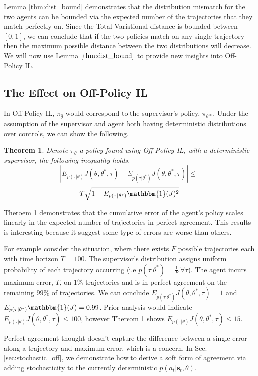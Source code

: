 \documentclass[conference]{article}
\newcommand{\bs}{\mathbf{s}}
\newtheorem{theorem}{Theorem}[section]
\begin{document}
Lemma \ref{thm:dist_bound} demonstrates that the distribution mismatch for the two agents can be bounded via the expected number of the trajectories that they match perfectly on.  Since the Total Variational distance is bounded between $[0,1]$, we can conclude that if the two policies match on any single trajectory then the maximum possible distance between the two distributions will decrease. We will now use Lemma $\ref{thm:dist_bound}$ to provide new insights into Off-Policy IL. 


\subsection{The Effect on Off-Policy IL} In Off-Policy IL, $\pi_{\hat{\theta}}$ would correspond to the supervisor's policy, $\pi_{\theta*}$. Under the assumption of the supervisor and agent both having deterministic distributions over controls, we can show the following. 

\begin{theorem}\label{thm:bc}
Denote $\pi_{\theta}$ a policy found using Off-Policy IL, with a deterministic supervisor, the following inequality holds:
$$ |E_{p(\tau|\theta)} J(\theta,\theta^*,\tau)  - E_{p(\tau|\theta^*)} J(\theta,\theta^*,\tau) | \leq \: $$
$$ T\sqrt{1 - E_{p(\tau|\theta^*)} \mathbbm{1}(J)^2} $$
\end{theorem}


Theroem \ref{thm:bc} demonstrates that the cumulative error of the agent's policy scales linearly in the expected number of trajectories in perfect agreement. This results is interesting because it suggest some type of errors are worse than others.

For example consider the situation, where there exists $F$ possible trajectories each with time horizon $T=100$. The supervisor's distribution assigns uniform probability of each trajectory occurring (i.e $p(\tau|\theta^*) = \frac{1}{F} \: \forall \tau$).  The agent incurs maximum error, $T$, on $1\%$ trajectories and is in perfect agreement on the remaining $99\%$ of trajectories. We can conclude $E_{p(\tau|\theta^*)} J(\theta,\theta^*,\tau) = 1$ and $E_{p(\tau|\theta^*)} \mathbbm{1}(J)  = 0.99$. Prior analysis would indicate $ E_{p(\tau|\theta)} J(\theta,\theta^*,\tau) \leq 100$, however Thereom \ref{thm:bc} shows $ E_{p(\tau|\theta)} J(\theta,\theta^*,\tau) \leq 15$. 

Perfect agreement thought doesn't capture the difference between a single error along a trajectory and maximum error, which is a concern. In Sec. \ref{sec:stochastic_off}, we demonstrate how to derive a soft form of agreement via adding stochasticity to the currently deterministic $p(a_t|\bs_t,\theta)$. 
\end{document}

